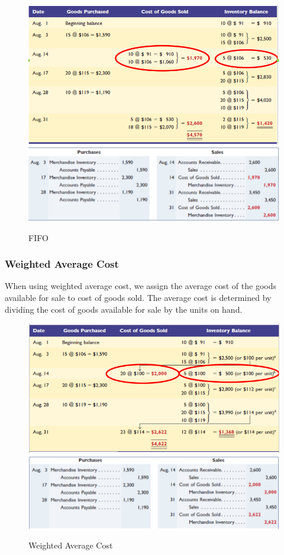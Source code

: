 \documentclass[../main.tex]{subfiles}
\begin{document}
	\begin{figure}[ht]
		\centering
		\includegraphics[width=\columnwidth]{images/c7/fifo.png}
		\includegraphics[width=\columnwidth]{images/c7/fifo_eg1.png}
		\caption{FIFO}
	\end{figure}
	
	\subsubsection{Weighted Average Cost}
	
	When using weighted average cost, we assign the average cost of the goods 
	available for sale to cost of goods sold.  The average cost is determined 
	by dividing the cost of goods available for sale by the units on hand.  
	
	\begin{figure}[ht]
		\centering
		\includegraphics[width=\columnwidth]{images/c7/weighted_average_cost.png}
		\includegraphics[width=\columnwidth]{images/c7/weighted_average_eg1.png}
		\caption{Weighted Average Cost}
	\end{figure}
	
\end{document}
